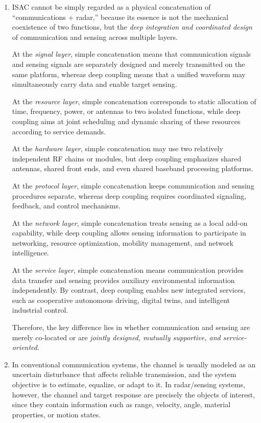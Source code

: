 \begin{enumerate}[label=\textbf{\arabic*.}, leftmargin=*]

    \item
    ISAC cannot be simply regarded as a physical concatenation of ``communications + radar,'' because its essence is not the mechanical coexistence of two functions, but the \emph{deep integration and coordinated design} of communication and sensing across multiple layers.

    At the \emph{signal layer}, simple concatenation means that communication signals and sensing signals are separately designed and merely transmitted on the same platform, whereas deep coupling means that a unified waveform may simultaneously carry data and enable target sensing.

    At the \emph{resource layer}, simple concatenation corresponds to static allocation of time, frequency, power, or antennas to two isolated functions, while deep coupling aims at joint scheduling and dynamic sharing of these resources according to service demands.

    At the \emph{hardware layer}, simple concatenation may use two relatively independent RF chains or modules, but deep coupling emphasizes shared antennas, shared front ends, and even shared baseband processing platforms.

    At the \emph{protocol layer}, simple concatenation keeps communication and sensing procedures separate, whereas deep coupling requires coordinated signaling, feedback, and control mechanisms.

    At the \emph{network layer}, simple concatenation treats sensing as a local add-on capability, while deep coupling allows sensing information to participate in networking, resource optimization, mobility management, and network intelligence.

    At the \emph{service layer}, simple concatenation means communication provides data transfer and sensing provides auxiliary environmental information independently. By contrast, deep coupling enables new integrated services, such as cooperative autonomous driving, digital twins, and intelligent industrial control.

    Therefore, the key difference lies in whether communication and sensing are merely co-located or are \emph{jointly designed, mutually supportive, and service-oriented}.

    \item 
    In conventional communication systems, the channel is usually modeled as an uncertain disturbance that affects reliable transmission, and the system objective is to estimate, equalize, or adapt to it. In radar/sensing systems, however, the channel and target response are precisely the objects of interest, since they contain information such as range, velocity, angle, material properties, or motion states.


\end{enumerate}
